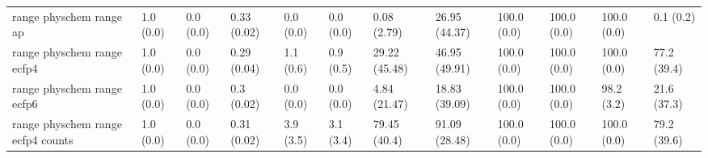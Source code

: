 \begin{tabular}{llllllllllll}
range physchem range ap & {\cellcolor[HTML]{F6FCFD}} \color[HTML]{000000} 1.0 (0.0) & {\cellcolor[HTML]{F7FCFD}} \color[HTML]{000000} 0.0 (0.0) & {\cellcolor[HTML]{ACDFD4}} \color[HTML]{000000} 0.33 (0.02) & {\cellcolor[HTML]{F7FCFD}} \color[HTML]{000000} 0.0 (0.0) & {\cellcolor[HTML]{F7FCFD}} \color[HTML]{000000} 0.0 (0.0) & {\cellcolor[HTML]{F7FCFD}} \color[HTML]{000000} 0.08 (2.79) & {\cellcolor[HTML]{C4E9E1}} \color[HTML]{000000} 26.95 (44.37) & {\cellcolor[HTML]{00441B}} \color[HTML]{F1F1F1} 100.0 (0.0) & {\cellcolor[HTML]{00441B}} \color[HTML]{F1F1F1} 100.0 (0.0) & {\cellcolor[HTML]{00441B}} \color[HTML]{F1F1F1} 100.0 (0.0) & {\cellcolor[HTML]{F7FCFD}} \color[HTML]{000000} 0.1 (0.2) \\
range physchem range ecfp4 & {\cellcolor[HTML]{F6FCFD}} \color[HTML]{000000} 1.0 (0.0) & {\cellcolor[HTML]{F7FCFD}} \color[HTML]{000000} 0.0 (0.0) & {\cellcolor[HTML]{BDE6DE}} \color[HTML]{000000} 0.29 (0.04) & {\cellcolor[HTML]{F6FCFD}} \color[HTML]{000000} 1.1 (0.6) & {\cellcolor[HTML]{F6FCFD}} \color[HTML]{000000} 0.9 (0.5) & {\cellcolor[HTML]{BCE6DD}} \color[HTML]{000000} 29.22 (45.48) & {\cellcolor[HTML]{72C7AD}} \color[HTML]{000000} 46.95 (49.91) & {\cellcolor[HTML]{00441B}} \color[HTML]{F1F1F1} 100.0 (0.0) & {\cellcolor[HTML]{00441B}} \color[HTML]{F1F1F1} 100.0 (0.0) & {\cellcolor[HTML]{00441B}} \color[HTML]{F1F1F1} 100.0 (0.0) & {\cellcolor[HTML]{1D8640}} \color[HTML]{F1F1F1} 77.2 (39.4) \\
range physchem range ecfp6 & {\cellcolor[HTML]{F6FCFD}} \color[HTML]{000000} 1.0 (0.0) & {\cellcolor[HTML]{F7FCFD}} \color[HTML]{000000} 0.0 (0.0) & {\cellcolor[HTML]{B7E4DA}} \color[HTML]{000000} 0.3 (0.02) & {\cellcolor[HTML]{F7FCFD}} \color[HTML]{000000} 0.0 (0.0) & {\cellcolor[HTML]{F7FCFD}} \color[HTML]{000000} 0.0 (0.0) & {\cellcolor[HTML]{F0F9FB}} \color[HTML]{000000} 4.84 (21.47) & {\cellcolor[HTML]{D8F0EF}} \color[HTML]{000000} 18.83 (39.09) & {\cellcolor[HTML]{00441B}} \color[HTML]{F1F1F1} 100.0 (0.0) & {\cellcolor[HTML]{00441B}} \color[HTML]{F1F1F1} 100.0 (0.0) & {\cellcolor[HTML]{00491D}} \color[HTML]{F1F1F1} 98.2 (3.2) & {\cellcolor[HTML]{D3EEEB}} \color[HTML]{000000} 21.6 (37.3) \\
range physchem range ecfp4 counts & {\cellcolor[HTML]{F6FCFD}} \color[HTML]{000000} 1.0 (0.0) & {\cellcolor[HTML]{F7FCFD}} \color[HTML]{000000} 0.0 (0.0) & {\cellcolor[HTML]{B4E2D8}} \color[HTML]{000000} 0.31 (0.02) & {\cellcolor[HTML]{F2FAFC}} \color[HTML]{000000} 3.9 (3.5) & {\cellcolor[HTML]{F3FAFC}} \color[HTML]{000000} 3.1 (3.4) & {\cellcolor[HTML]{16803C}} \color[HTML]{F1F1F1} 79.45 (40.4) & {\cellcolor[HTML]{006027}} \color[HTML]{F1F1F1} 91.09 (28.48) & {\cellcolor[HTML]{00441B}} \color[HTML]{F1F1F1} 100.0 (0.0) & {\cellcolor[HTML]{00441B}} \color[HTML]{F1F1F1} 100.0 (0.0) & {\cellcolor[HTML]{00441B}} \color[HTML]{F1F1F1} 100.0 (0.0) & {\cellcolor[HTML]{17813D}} \color[HTML]{F1F1F1} 79.2 (39.6) \\

\end{tabular}
